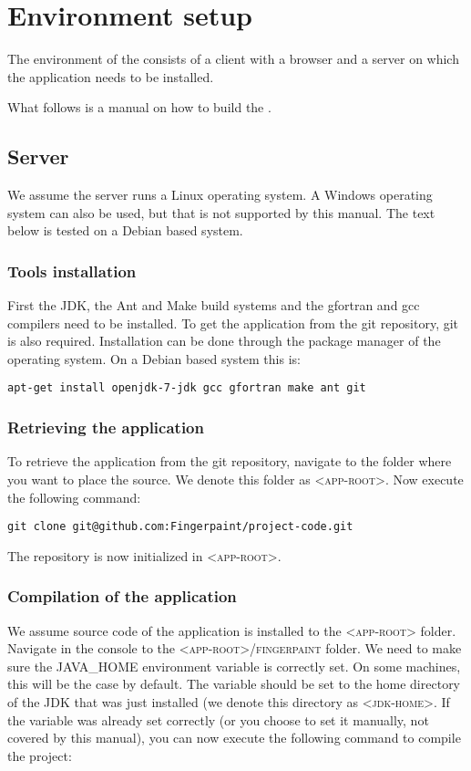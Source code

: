 \chapter{Environment setup}
\label{environment_setup}

The environment of the \applicationname{} consists of a client with a browser and a server on which the application needs to be installed.

What follows is a manual on how to build the \applicationname{}.

\section{Server}
We assume the server runs a Linux operating system. A Windows operating system can also be used, but that is not supported by this manual. The text below is tested on a Debian based system.

\subsection{Tools installation}
\label{sec:building}
First the JDK, the Ant and Make build systems and the gfortran and gcc compilers need to be installed. To get the application from the git repository, git is also required. Installation can be done through the package manager of the operating system. On a Debian based system this is:

\begin{verbatim}
apt-get install openjdk-7-jdk gcc gfortran make ant git
\end{verbatim}

\subsection{Retrieving the application}
\label{sec:retrieving}
To retrieve the application from the git repository, navigate to the folder where you want to place the source.
We denote this folder as \textsc{<app-root>}. Now execute the following command:

\begin{verbatim}
git clone git@github.com:Fingerpaint/project-code.git
\end{verbatim}

The repository is now initialized in \textsc{<app-root>}.

\subsection{Compilation of the application}
\label{sec:compiling}
We assume source code of the application is installed to the \textsc{<app-root>} folder.
Navigate in the console to the \textsc{<app-root>/fingerpaint} folder. 
We need to make sure the \textsc{JAVA\_HOME} environment variable is correctly set. On some machines, this will be the case by default. The variable should be set to the home directory of the JDK that was just installed (we denote this directory as \textsc{<jdk-home>}. If the variable was already set correctly (or you choose to set it manually, not covered by this manual), you can now execute the following command to compile the project:

